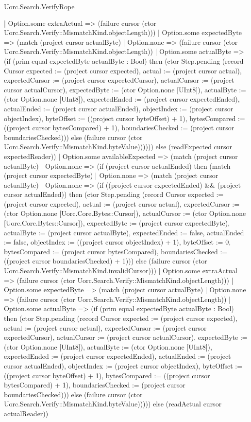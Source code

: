 \begin{lexlean}{Uorc.Search.VerifyRope}
\begin{semanticmodule}
{          | Option.some extraActual => (failure cursor (ctor Uorc.Search.Verify::MismatchKind.objectLength)))
        | Option.some expectedByte => (match (project cursor actualByte)
          | Option.none => (failure cursor (ctor Uorc.Search.Verify::MismatchKind.objectLength))
          | Option.some actualByte => (if (prim equal expectedByte actualByte : Bool) then (ctor Step.pending (record Cursor {expected := (project cursor expected), actual := (project cursor actual), expectedCursor := (project cursor expectedCursor), actualCursor := (project cursor actualCursor), expectedByte := (ctor Option.none [UInt8]), actualByte := (ctor Option.none [UInt8]), expectedEnded := (project cursor expectedEnded), actualEnded := (project cursor actualEnded), objectIndex := (project cursor objectIndex), byteOffset := ((project cursor byteOffset) + 1), bytesCompared := ((project cursor bytesCompared) + 1), boundariesChecked := (project cursor boundariesChecked)})) else (failure cursor (ctor Uorc.Search.Verify::MismatchKind.byteValue)))))) else (readExpected cursor expectedReader))
    | Option.some availableExpected => (match (project cursor actualByte)
      | Option.none => (if (project cursor actualEnded) then (match (project cursor expectedByte)
        | Option.none => (match (project cursor actualByte)
          | Option.none => (if ((project cursor expectedEnded) && (project cursor actualEnded)) then (ctor Step.pending (record Cursor {expected := (project cursor expected), actual := (project cursor actual), expectedCursor := (ctor Option.none [Uorc.Core.Bytes::Cursor]), actualCursor := (ctor Option.none [Uorc.Core.Bytes::Cursor]), expectedByte := (project cursor expectedByte), actualByte := (project cursor actualByte), expectedEnded := false, actualEnded := false, objectIndex := ((project cursor objectIndex) + 1), byteOffset := 0, bytesCompared := (project cursor bytesCompared), boundariesChecked := ((project cursor boundariesChecked) + 1)})) else (failure cursor (ctor Uorc.Search.Verify::MismatchKind.invalidCursor)))
          | Option.some extraActual => (failure cursor (ctor Uorc.Search.Verify::MismatchKind.objectLength)))
        | Option.some expectedByte => (match (project cursor actualByte)
          | Option.none => (failure cursor (ctor Uorc.Search.Verify::MismatchKind.objectLength))
          | Option.some actualByte => (if (prim equal expectedByte actualByte : Bool) then (ctor Step.pending (record Cursor {expected := (project cursor expected), actual := (project cursor actual), expectedCursor := (project cursor expectedCursor), actualCursor := (project cursor actualCursor), expectedByte := (ctor Option.none [UInt8]), actualByte := (ctor Option.none [UInt8]), expectedEnded := (project cursor expectedEnded), actualEnded := (project cursor actualEnded), objectIndex := (project cursor objectIndex), byteOffset := ((project cursor byteOffset) + 1), bytesCompared := ((project cursor bytesCompared) + 1), boundariesChecked := (project cursor boundariesChecked)})) else (failure cursor (ctor Uorc.Search.Verify::MismatchKind.byteValue))))) else (readActual cursor actualReader))
}
\end{semanticmodule}
\end{lexlean}

